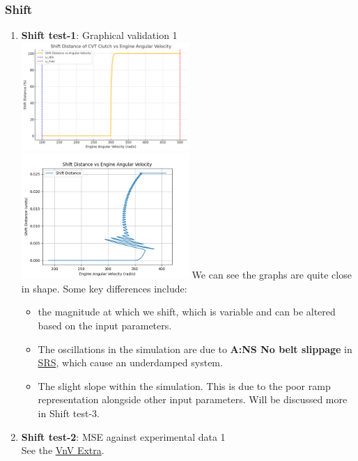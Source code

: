 \documentclass[12pt, titlepage]{article}
\begin{document}
\subsubsection{Shift}
\begin{enumerate}
\item{\textbf{Shift test-1}: Graphical validation 1}\\

\includegraphics[width=0.5\textwidth]{theoretical-figures/shift_vs_engine.png}
\includegraphics[width=0.5\textwidth]{simulation-figures/shift_distance_vs_engine_velocity.png}
We can see the graphs are quite close in shape. Some key differences include:
\begin{itemize}
  \item the magnitude at which we shift, which is variable and can be altered based on the input parameters.
  \item The oscillations in the simulation are due to \textbf{A:NS No belt slippage} in \href{https://github.com/gr812b/CVT-Simulator/blob/develop/docs/SRS/SRS.pdf}{SRS}, which cause an underdamped system.
  \item The slight slope within the simulation. This is due to the poor ramp representation alongside other input parameters. Will be discussed more in Shift test-3.
\end{itemize}


\item{\textbf{Shift test-2}: MSE against experimental data 1}\\
See the \href{https://github.com/gr812b/CVT-Simulator/blob/develop/docs/VnVExtra/VnVExtra.pdf}{VnV Extra}.


\end{enumerate}
\end{document}
